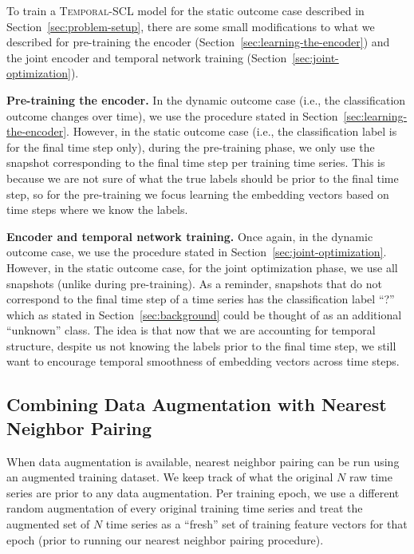 \documentclass[pmlr,twocolumn,10pt]{jmlr} %
\begin{document}
To train a \textsc{Temporal-SCL} model for the static outcome case described in Section~\ref{sec:problem-setup}, there are some small modifications to what we described for pre-training the encoder (Section~\ref{sec:learning-the-encoder}) and the joint encoder and temporal network training (Section~\ref{sec:joint-optimization}).

\vspace{.2em}
\noindent
\textbf{Pre-training the encoder.}
In the dynamic outcome case (i.e., the classification outcome changes over time), we use the procedure stated in Section~\ref{sec:learning-the-encoder}. However, in the static outcome case (i.e., the classification label is for the final time step only), during the pre-training phase, we only use the snapshot corresponding to the final time step per training time series. This is because we are not sure of what the true labels should be prior to the final time step, so for the pre-training we focus learning the embedding vectors based on time steps where we know the labels.

\vspace{.2em}
\noindent
\textbf{Encoder and temporal network training.} Once again, in the dynamic outcome case, we use the procedure stated in Section~\ref{sec:joint-optimization}. However, in the static outcome case, for the joint optimization phase, we use all snapshots (unlike during pre-training). As a reminder, snapshots that do not correspond to the final time step of a time series has the classification label ``?'' which as stated in Section~\ref{sec:background} could be thought of as an additional ``unknown'' class. The idea is that now that we are accounting for temporal structure, despite us not knowing the labels prior to the final time step, we still want to encourage temporal smoothness of embedding vectors across time steps.

\subsection{Combining Data Augmentation with Nearest Neighbor Pairing}
\label{sec:data-augmentation-with-nn-pairing}

When data augmentation is available, nearest neighbor pairing can be run using an augmented training dataset. We keep track of what the original $N$ raw time series are prior to any data augmentation. Per training epoch, we use a different random augmentation of every original training time series and treat the augmented set of $N$ time series as a ``fresh'' set of training feature vectors for that epoch (prior to running our nearest neighbor pairing procedure).
\end{document}
